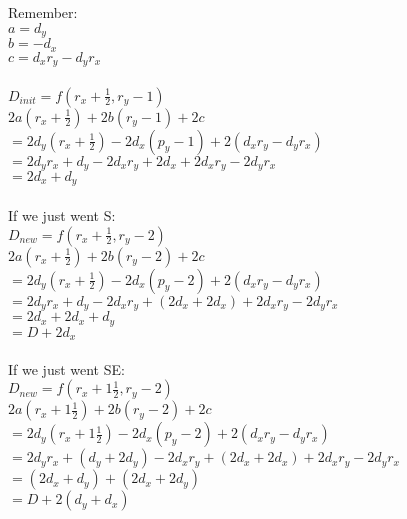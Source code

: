 \documentclass[12pt]{article}
\begin{document}
\begin{enumerate}
Remember: \\
$a = d_y$ \\ 
$b = -d_x$ \\
$c = d_x r_y - d_y r_x$ \\ \\

$D_{init} = f(r_x + \frac{1}{2}, r_y - 1)$ \\
$2a(r_x + \frac{1}{2}) + 2b(r_y - 1) + 2c$ \\
$ = 2d_y (r_x + \frac{1}{2}) - 2d_x(p_y - 1) + 2(d_x r_y - d_y r_x)$ \\
$ = 2d_y r_x + d_y - 2d_x r_y + 2d_x + 2d_x r_y - 2d_y r_x$ \\
$ = 2d_x + d_y$ \\ \\

If we just went S: \\
$D_{new} = f(r_x + \frac{1}{2}, r_y - 2)$ \\
$2a(r_x + \frac{1}{2}) + 2b(r_y - 2) + 2c$ \\
$ = 2d_y (r_x + \frac{1}{2}) - 2d_x(p_y - 2) + 2(d_x r_y - d_y r_x)$ \\
$ = 2d_y r_x + d_y - 2d_x r_y + (2d_x + 2d_x) + 2d_x r_y - 2d_y r_x$ \\
$ = 2d_x + 2d_x + d_y$ \\
$ = D + 2d_x$ \\ \\

If we just went SE: \\
$D_{new} = f(r_x + 1\frac{1}{2}, r_y - 2)$ \\
$2a(r_x + 1\frac{1}{2}) + 2b(r_y - 2) + 2c$ \\
$ = 2d_y (r_x + 1\frac{1}{2}) - 2d_x(p_y - 2) + 2(d_x r_y - d_y r_x)$ \\
$ = 2d_y r_x + (d_y + 2d_y) - 2d_x r_y + (2d_x + 2d_x) + 2d_x r_y - 2d_y r_x$ \\
$ = (2d_x + d_y) + (2d_x + 2d_y)$ \\ 
$ = D + 2(d_y + d_x)$ \\ \\

\end{enumerate}
\end{document}
